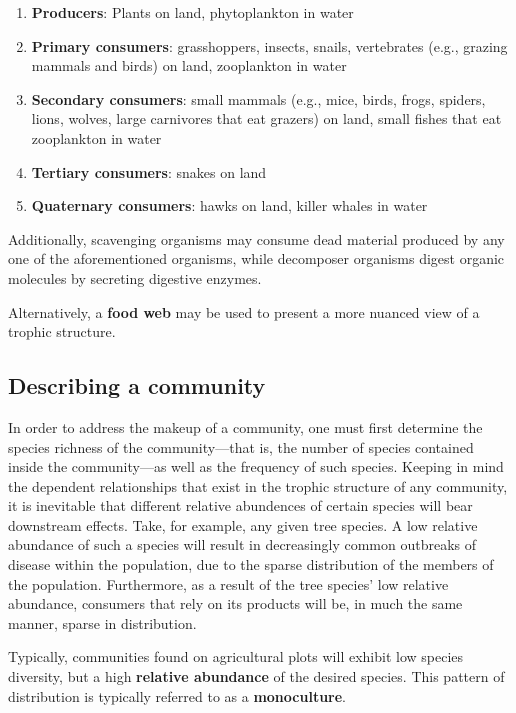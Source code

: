 \documentclass{article}
\begin{document}
\begin{enumerate}
	\item \textbf{Producers}: Plants on land, phytoplankton in water
	\item \textbf{Primary consumers}: grasshoppers, insects, snails,
	vertebrates (e.g., grazing mammals and birds) on land, zooplankton in water
	\item \textbf{Secondary consumers}: small mammals (e.g., mice, birds, frogs,
	spiders, lions, wolves, large carnivores that eat grazers) on land, small
	fishes that eat zooplankton in water
	\item \textbf{Tertiary consumers}: snakes on land
	\item \textbf{Quaternary consumers}: hawks on land, killer whales in water
\end{enumerate}

Additionally, scavenging organisms may consume dead material produced by any one
of the aforementioned organisms, while decomposer organisms digest organic
molecules by secreting digestive enzymes.

Alternatively, a \textbf{food web} may be used to present a more nuanced view of
a trophic structure.

\subsection{Describing a community}

In order to address the makeup of a community, one must first determine
the species richness of the community---that is, the number of species
contained inside the community---as well as the frequency of such species.
Keeping in mind the dependent relationships that exist in the trophic structure
of any community, it is inevitable that different relative abundences of certain
species will bear downstream effects. Take, for example, any given tree species.
A low relative abundance of such a species will result in decreasingly common
outbreaks of disease within the population, due to the sparse distribution of
the members of the population. Furthermore, as a result of the tree species' low
relative abundance, consumers that rely on its products will be, in much the same
manner, sparse in distribution.

Typically, communities found on agricultural plots will exhibit low species
diversity, but a high \textbf{relative abundance} of the desired species. This
pattern of distribution is typically referred to as a \textbf{monoculture}.
\end{document}
